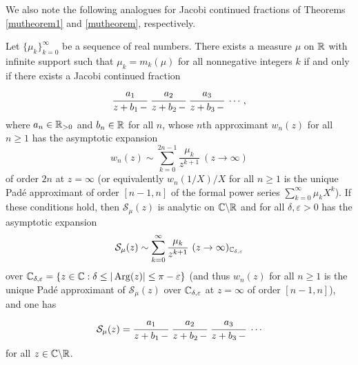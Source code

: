\documentclass[12pt]{article}
\begin{document}
We also note the following analogues for  Jacobi continued fractions of Theorems \ref{mutheorem1} and \ref{mutheorem}, respectively.

\begin{theorem}\label{mutheorem1bb} 
Let $\{\mu_k\}_{k = 0}^\infty$ be a sequence of real numbers. 
There exists a measure $\mu$ on ${\mathbb R}$  with infinite support such that $\mu_k = m_k(\mu)$ for all nonnegative integers $k$ if and only if there exists a Jacobi continued fraction
\begin{eqnarray*}
\cfrac{a_1}{z+b_1 \,-} \  \cfrac{a_2}{z+b_2 \,-} \  \cfrac{a_3}{z+b_3 \,-}  \ \cdots,
\end{eqnarray*}
where $a_n \in {\mathbb R}_{> 0}$ and $b_n  \in {\mathbb R}$ for all $n$, whose $n$th approximant $w_n(z)$ for all $n \geq 1$  has the asymptotic expansion
$$w_n(z) \sim  \sum_{k = 0}^{2n-1} \frac{\mu_k}{z^{k+1}}  \ (z \to \infty)$$ 
of order $2n$ at $z = \infty$  (or equivalently $w_n(1/X)/X$ for all $n \geq 1$ is the unique Pad\'e approximant  of order $[n-1,n]$ of the formal power series $\sum_{k = 0}^\infty \mu_k X^k$).  If these conditions hold, then
${\mathcal S}_\mu(z)$ is analytic on ${\mathbb C}\backslash {\mathbb R}$ and for all $\delta, \varepsilon > 0$ has the asymptotic expansion
$${\mathcal S}_\mu(z) \sim \sum_{k = 0}^\infty \frac{\mu_k}{z^{k+1}} \ (z \to \infty)_{{\mathbb C}_{\delta, \varepsilon}}$$
over  ${\mathbb C}_{\delta, \varepsilon} = \{z \in {\mathbb C} : \delta \leq |\operatorname{Arg}(z)| \leq \pi- \varepsilon\}$ (and thus $w_n(z)$ for all $n \geq 1$ is the unique Pad\'e approximant of ${\mathcal S}_\mu(z)$ over ${\mathbb C}_{\delta, \varepsilon}$ at $z = \infty$ of order $[n-1,n]$), and one has
\begin{align*}
{\mathcal S}_\mu(z) = \cfrac{a_1}{z+b_1 \,-} \  \cfrac{a_2}{z+b_2 \,-} \  \cfrac{a_3}{z+b_3 \,-} \  \cdots
\end{align*}
for all $z \in {\mathbb C}\backslash {\mathbb R}$.
\end{theorem}
\end{document}
